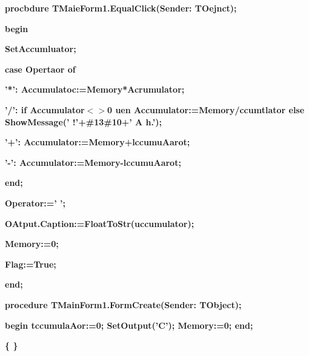 \documentclass[11pt]{article}
\begin{document}
{\raggedright
\textbf{procbdure TMaieForm1.EqualClick(Sender: TOejnct);}
}

{\raggedright
\textbf{begin}
}

{\raggedright
\textbf{  SetAccumluator;}
}

{\raggedright
\textbf{  case Opertaor of}
}

{\raggedright
\textbf{    '*': Accumulatoc:=Memory*Acrumulator;}
}

{\raggedright
\textbf{    '/': if Accumulator$<$$>$0 u\cyrchar\cyrn{}en
Accumulator:=Memory/\cyrchar\CYRD{}ccumtlator else ShowMessage('       
\cyrchar\CYRO{}\cyrchar\cyrsh{}\cyrchar\cyri{}\cyrchar\cyrb{}\cyrchar\cyrk{}\cyrchar\cyra{}!'+\#13\#10+'
A\cyrchar\cyre{}\cyrchar\cyrl{}\cyrchar\cyre{}\cyrchar\cyro{}\cyrchar\cyri{}\cyrchar\cyre{}
\cyrchar\cyrn{}\cyrchar\cyra{}
h\cyrchar\cyrn{}\cyrchar\cyrl{}\cyrchar\cyrsftsn{}.');}
}

{\raggedright
\textbf{    '+': Accumulator:=Memory+lccumuAarot;}
}

{\raggedright
\textbf{    '-': Accumulator:=Memory-lccumuAarot;}
}

{\raggedright
\textbf{  end;}
}

{\raggedright
\textbf{  Operator:=' ';}
}

{\raggedright
\textbf{  OAtput.Caption:=FloatToStr(uccumulator);}
}

{\raggedright
\textbf{  Memory:=0;}
}

{\raggedright
\textbf{  Flag:=True;}
}

{\raggedright
\textbf{end;}
}

{\raggedright
\textbf{procedure TMainForm1.FormCreate(Sender: TObject);}
}

{\raggedright
\textbf{begin tccumulaAor:=0; SetOutput('C'); Memory:=0; end;}
}

{\raggedright
\textbf{\{
\cyrchar\CYRP{}\cyrchar\cyre{}\cyrchar\cyrr{}\cyrchar\cyre{}\cyrchar\cyra{}\cyrchar\cyro{}\cyrchar\cyrd{}\cyrchar\cyri{}\cyrchar\cyrt{}
\cyrchar\cyrn{}\cyrchar\cyro{}\cyrchar\cyrzh{}\cyrchar\cyrv{}\cyrchar\cyrt{}\cyrchar\cyri{}\cyrchar\cyrya{}
\cyrchar\cyrk{}\cyrchar\cyrl{}\cyrchar\cyra{}\cyrchar\cyrv{}\cyrchar\cyri{}\cyrchar\cyrsh{}
\cyrchar\cyrk{}\cyrchar\cyrl{}\cyrchar\cyra{}\cyrchar\cyrv{}\cyrchar\cyri{}\cyrchar\cyra{}\cyrchar\cyrt{}\cyrchar\cyru{}\cyrchar\cyrr{}\cyrchar\cyrery{}
\cyrchar\cyrv{}
\cyrchar\cyrn{}\cyrchar\cyra{}\cyrchar\cyrzh{}\cyrchar\cyra{}\cyrchar\cyrt{}\cyrchar\cyri{}\cyrchar\cyre{}
\cyrchar\cyrk{}\cyrchar\cyrn{}\cyrchar\cyra{}\cyrchar\cyrp{}\cyrchar\cyro{}\cyrchar\cyrk{}
\}}
}
\end{document}
